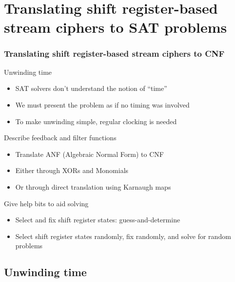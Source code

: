 \documentclass[xcolor=usenames,xcolor=svgnames,table,slidestop,compress,mathserif]{beamer}
\begin{document}
\section{Translating shift register-based stream ciphers to SAT problems}

\frame
{\frametitle{Translating shift register-based stream ciphers to CNF}
\begin{beamerboxesrounded}[shadow=true]{Unwinding time}
\begin{itemize}
 \item SAT solvers don't understand the notion of ``time''
 \item We must present the problem as if no timing was involved
 \item To make unwinding simple, regular clocking is needed
\end{itemize}
\end{beamerboxesrounded}

\smallskip

\begin{beamerboxesrounded}[shadow=true]{Describe feedback and filter functions}
\begin{itemize}
 \item Translate ANF (Algebraic Normal Form) to CNF
 \item Either through XORs and Monomials
 \item Or through direct translation using Karnaugh maps
\end{itemize}
\end{beamerboxesrounded}

\smallskip

\begin{beamerboxesrounded}[shadow=true]{Give help bits to aid solving}
\begin{itemize}
 \item Select and fix shift register states: guess-and-determine
 \item Select shift register states randomly, fix randomly, and solve for random problems
\end{itemize}
\end{beamerboxesrounded}
}

\subsection{Unwinding time}
\end{document}
